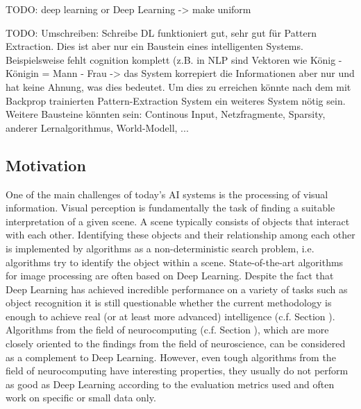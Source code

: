 TODO: deep learning or Deep Learning -> make uniform

TODO: Umschreiben: Schreibe DL funktioniert gut, sehr gut für Pattern Extraction. Dies ist aber nur ein Baustein eines intelligenten Systems. Beispielsweise fehlt cognition komplett (z.B. in NLP sind Vektoren wie König - Königin = Mann - Frau -> das System korrepiert die Informationen aber nur und hat keine Ahnung, was dies bedeutet. Um dies zu erreichen könnte nach dem mit Backprop trainierten Pattern-Extraction System ein weiteres System nötig sein. Weitere Bausteine könnten sein: Continous Input, Netzfragmente, Sparsity, anderer Lernalgorithmus, World-Modell, ...

\subsection{Motivation}
One of the main challenges of today's AI systems is the processing of visual information.
Visual perception is fundamentally the task of finding a suitable interpretation of a given scene.
A scene typically consists of objects that interact with each other.
Identifying these objects and their relationship among each other is implemented by algorithms as a non-deterministic search problem, i.e. algorithms try to identify the object within a scene.
State-of-the-art algorithms for image processing are often based on Deep Learning.
Despite the fact that Deep Learning has achieved incredible performance on a variety of tasks such as object recognition it is still questionable whether the current methodology is enough to achieve real (or at least more advanced) intelligence (c.f. Section ).
Algorithms from the field of neurocomputing (c.f. Section ), which are more closely oriented to the findings from the field of neuroscience, can be considered as a complement to Deep Learning.
However, even tough algorithms from the field of neurocomputing have interesting properties, they usually do not perform as good as Deep Learning according to the evaluation metrics used and often work on specific or small data only.

